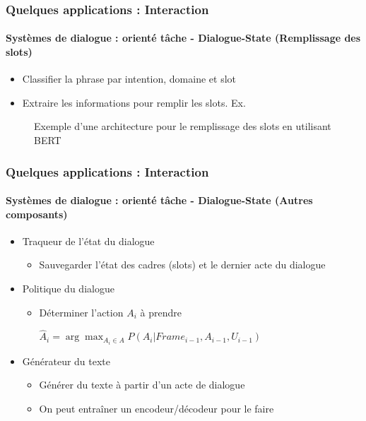 \documentclass[xcolor=table]{beamer}
\begin{document}
\begin{frame}
	\frametitle{Quelques applications : Interaction}
	\framesubtitle{Systèmes de dialogue : orienté tâche - Dialogue-State (Remplissage des slots)}
	
	\begin{itemize}
		\item Classifier la phrase par intention, domaine et slot
		\item Extraire les informations pour remplir les slots. Ex. 
	\end{itemize}
	
	\begin{figure}
		\centering
		\caption{Exemple d'une architecture pour le remplissage des slots en utilisant BERT \cite{2020-jurafsky-martin}}
	\end{figure}
	
\end{frame}

\begin{frame}
	\frametitle{Quelques applications : Interaction}
	\framesubtitle{Systèmes de dialogue : orienté tâche - Dialogue-State (Autres composants)}
	
	\begin{itemize}
		\item Traqueur de l'état du dialogue
		\begin{itemize}
			\item Sauvegarder l'état des cadres (slots) et le dernier acte du dialogue
		\end{itemize}
		\item Politique du dialogue
		\begin{itemize}
			\item Déterminer l'action $A_i$ à prendre 
			
			$\hat{A}_i = \arg\max_{A_i \in A} P(A_i | Frame_{i-1}, A_{i-1}, U_{i-1})$
		\end{itemize}
	
		\item Générateur du texte 
		\begin{itemize}
			\item Générer du texte à partir d'un acte de dialogue
			\item On peut entraîner un encodeur/décodeur pour le faire
		\end{itemize}
	\end{itemize}
	
\end{frame}
\end{document}
